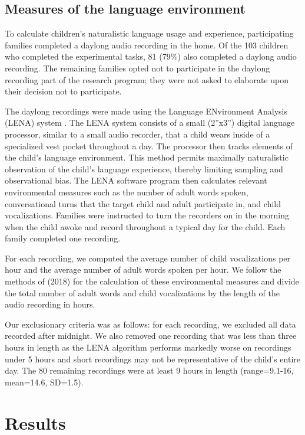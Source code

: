 \documentclass[a4paper,man,natbib,donotrepeattitle, apacite]{apa6}
\begin{document}
\subsection{Measures of the language environment}

To calculate children’s naturalistic language usage and experience, participating families completed a daylong audio recording in the home. Of the 103 children who completed the experimental tasks, 81 (79\%) also completed a daylong audio recording. The remaining families opted not to participate in the daylong recording part of the research program; they were not asked to elaborate upon their decision not to participate. 

The daylong recordings were made using the Language ENvironment Analysis (LENA) system \cite{greenwoodAssessingChildrenHome2011}. The LENA system consists of a small (2”x3”) digital language processor, similar to a small audio recorder, that a child wears inside of a specialized vest pocket throughout a day. The processor then tracks elements of the child’s language environment. This method permits maximally naturalistic observation of the child’s language experience, thereby limiting sampling and observational bias. The LENA software program then calculates relevant environmental measures such as the number of adult words spoken, conversational turns that the target child and adult participate in, and child vocalizations. Families were instructed to turn the recorders on in the morning when the child awoke and record throughout a typical day for the child. Each family completed one recording. 

For each recording, we computed the average number of child vocalizations per hour and the average number of adult words spoken per hour. We follow the methods of \cite{mahrUsingLanguageInput2018} (2018) for the calculation of these environmental measures and divide the total number of adult words and child vocalizations by the length of the audio recording in hours.  

Our exclusionary criteria was as follows: for each recording, we excluded all data recorded after midnight. We also removed one recording that was less than three hours in length as the LENA algorithm performs markedly worse on recordings under 5 hours \cite{xuReliabilityLENALanguage2009} and short recordings may not be representative of the child’s entire day. The 80 remaining recordings were at least 9 hours in length (range=9.1-16, mean=14.6, SD=1.5).

\section{Results}
\end{document}

